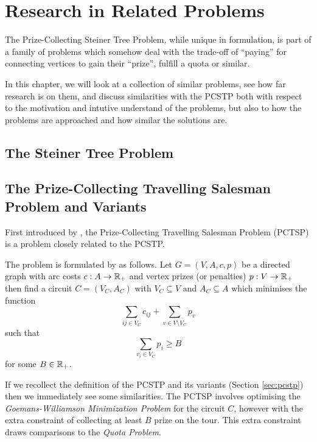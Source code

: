 \chapter{Research in Related Problems}
\label{chap:related}
The Prize-Collecting Steiner Tree Problem, while unique in formulation,
is part of a family of problems which somehow deal with the trade-off of
``paying'' for connecting vertices to gain their ``prize'', fulfill a quota
or similar.

In this chapter, we will look at a collection of similar problems, see how far research is
on them, and discuss similarities with the PCSTP both with respect to the motivation and
intutive understand of the problems, but also to how the problems are approached and
how similar the solutions are.



\section{The Steiner Tree Problem}
\section{The Prize-Collecting Travelling Salesman Problem and Variants}
First introduced by \citet*{balas1989prize}, the Prize-Collecting Travelling Salesman Problem
(PCTSP) is a problem closely related to the PCSTP.

The problem is formulated by \citeauthor{balas1989prize} as follows. Let
$G = (V, A, c, p)$ be a directed
graph with arc costs $c: A \to \mathbb{R}_+$ and vertex prizes (or penalties) $p: V \to \mathbb{R}_+$
then find a circuit $C = (V_C, A_C)$ with $V_C \subseteq V$ and $A_C \subseteq A$ which
minimises the function
$$\sum_{ij \in V_C} c_{ij} + \sum_{v \in V \setminus V_C} p_v$$
such that
$$\sum_{v_i \in V_C} p_i \geq B$$
for some $B \in \mathbb{R}_+$.

If we recollect the definition of the PCSTP and its variants (Section \ref{sec:pcstp}) then
we immediately see some similarities. The PCTSP involves optimising the
\textit{Goemans-Williamson Minimization Problem} for the circuit $C$, however with the extra
constraint of collecting at least $B$ prize on the tour. This extra constraint draws comparisons
to the \textit{Quota Problem}.

